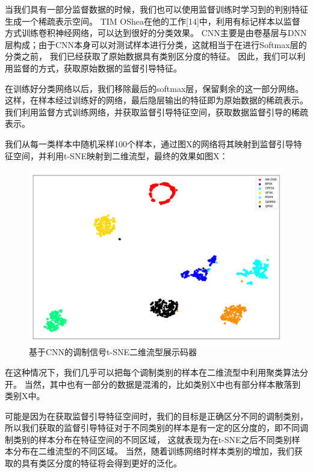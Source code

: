 当我们具有一部分监督数据的时候，我们也可以使用监督训练时学习到的判别特征生成一个稀疏表示空间。
TIM OShea在他的工作[14]中，利用有标记样本以监督方式训练卷积神经网络，可以达到很好的分类效果。
CNN主要是由卷基层与DNN层构成；由于CNN本身可以对测试样本进行分类，这就相当于在进行Softmax层的分类之前，
我们已经获取了原始数据具有类别区分度的特征。
因此，我们可以利用监督的方式，获取原始数据的监督引导特征。\par

在训练好分类网络以后，我们移除最后的softmax层，保留剩余的这一部分网络。
这样，在样本经过训练好的网络，最后隐层输出的特征即为原始数据的稀疏表示。
我们利用监督方式训练网络，并获取监督引导特征空间，获取数据监督引导的稀疏表示。\par
我们从每一类样本中随机采样100个样本，通过图X的网络将其映射到监督引导特征空间，并利用t-SNE映射到二维流型，最终的效果如图X：
\begin{figure}[!h]
	\centering
	\includegraphics[scale=0.4]{figures/chapter_3/fig_3_7}
	\caption{基于CNN的调制信号t-SNE二维流型展示码器}	\label{sec:fig_3_7}
\end{figure}

在这种情况下，我们几乎可以把每个调制类别的样本在二维流型中利用聚类算法分开。
当然，其中也有一部分的数据是混淆的，比如类别X中也有部分样本散落到类别X中。\par
可能是因为在获取监督引导特征空间时，我们的目标是正确区分不同的调制类别，
所以我们获取的监督引导特征对于不同类别的样本是有一定的区分度的，即不同调制类别的样本分布在特征空间的不同区域，
这就表现为在t-SNE之后不同类别样本分布在二维流型的不同区域。
当然，随着训练网络时样本类别的增加，我们获取的具有类区分度的特征将会得到更好的泛化。\par


